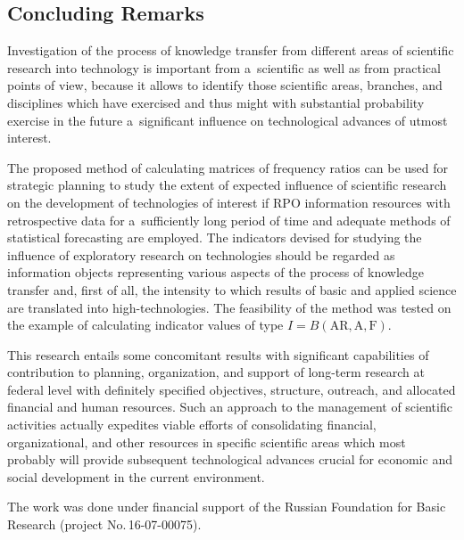 \begin{multicols}{2}
\section*{Concluding Remarks}

\noindent
Investigation of the process of knowledge transfer from different areas of 
scientific research into technology is important from a~scientific as well as 
from practical points of view, because it allows to identify those scientific 
areas, branches, and disciplines which have exercised and thus might with 
substantial probability exercise in the future a~significant influence on 
technological advances of utmost interest.

    The proposed method of calculating matrices of frequency ratios can be used for 
strategic planning to study the extent of expected influence of scientific research on 
the development of technologies of interest if RPO information resources with 
retrospective data for a~sufficiently long period of time and adequate methods of 
statistical forecasting are employed. The indicators devised for studying the influence 
of exploratory research on technologies should be regarded as information objects 
representing various aspects of the process of knowledge transfer and, first of all, the 
intensity to which results of basic and applied science are translated into  
high-technologies. The feasibility of the method was tested on the example of 
calculating indicator values of type $I = B(\mathrm{AR, A, F})$.
    
    
    
    This research entails some concomitant results with significant capabilities of 
contribution to planning, organization, and support of long-term research at federal 
level with definitely specified objectives, structure, outreach, and allocated financial 
and human resources. Such an approach to the management of scientific activities 
actually expedites viable efforts of consolidating financial, organizational, and other 
resources in specific scientific areas which most probably will provide subsequent 
technological advances crucial for economic and social development in the current 
environment.
    
   
    
 \Ack
    \noindent
    The work was done under financial support of the Russian Foundation for Basic 
Research (project No.\,16-07-00075).


\renewcommand{\bibname}{\protect\rmfamily References}


\end{multicols}
